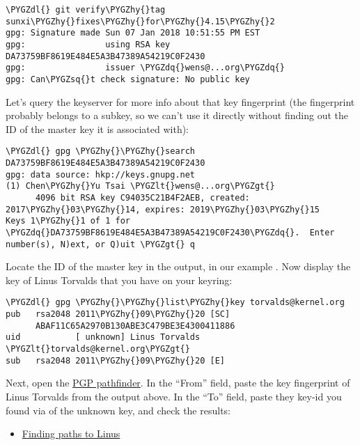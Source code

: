 \documentclass[a4paper,8pt,english]{sphinxmanual}
\def\PYGZlt{\char`\<}
\def\PYGZgt{\char`\>}
\def\PYGZdl{\char`\$}
\def\PYGZhy{\char`\-}
\def\PYGZsq{\char`\'}
\def\PYGZdq{\char`\"}
\renewcommand\PYGZsq{\textquotesingle}
\begin{document}
\begin{Verbatim}[commandchars=\\\{\}]
\PYGZdl{} git verify\PYGZhy{}tag sunxi\PYGZhy{}fixes\PYGZhy{}for\PYGZhy{}4.15\PYGZhy{}2
gpg: Signature made Sun 07 Jan 2018 10:51:55 PM EST
gpg:                using RSA key DA73759BF8619E484E5A3B47389A54219C0F2430
gpg:                issuer \PYGZdq{}wens@...org\PYGZdq{}
gpg: Can\PYGZsq{}t check signature: No public key
\end{Verbatim}

Let's query the keyserver for more info about that key fingerprint (the
fingerprint probably belongs to a subkey, so we can't use it directly
without finding out the ID of the master key it is associated with):

\begin{Verbatim}[commandchars=\\\{\}]
\PYGZdl{} gpg \PYGZhy{}\PYGZhy{}search DA73759BF8619E484E5A3B47389A54219C0F2430
gpg: data source: hkp://keys.gnupg.net
(1) Chen\PYGZhy{}Yu Tsai \PYGZlt{}wens@...org\PYGZgt{}
      4096 bit RSA key C94035C21B4F2AEB, created: 2017\PYGZhy{}03\PYGZhy{}14, expires: 2019\PYGZhy{}03\PYGZhy{}15
Keys 1\PYGZhy{}1 of 1 for \PYGZdq{}DA73759BF8619E484E5A3B47389A54219C0F2430\PYGZdq{}.  Enter number(s), N)ext, or Q)uit \PYGZgt{} q
\end{Verbatim}

Locate the ID of the master key in the output, in our example
. Now display the key of Linus Torvalds that you
have on your keyring:

\begin{Verbatim}[commandchars=\\\{\}]
\PYGZdl{} gpg \PYGZhy{}\PYGZhy{}list\PYGZhy{}key torvalds@kernel.org
pub   rsa2048 2011\PYGZhy{}09\PYGZhy{}20 [SC]
      ABAF11C65A2970B130ABE3C479BE3E4300411886
uid           [ unknown] Linus Torvalds \PYGZlt{}torvalds@kernel.org\PYGZgt{}
sub   rsa2048 2011\PYGZhy{}09\PYGZhy{}20 [E]
\end{Verbatim}

Next, open the \href{https://pgp.cs.uu.nl/}{PGP pathfinder}. In the ``From'' field, paste the key
fingerprint of Linus Torvalds from the output above. In the ``To'' field,
paste they key-id you found via  of the unknown key, and
check the results:
\begin{itemize}
\item {} 
\href{https://pgp.cs.uu.nl/paths/79BE3E4300411886/to/C94035C21B4F2AEB.html}{Finding paths to Linus}

\end{itemize}
\end{document}
